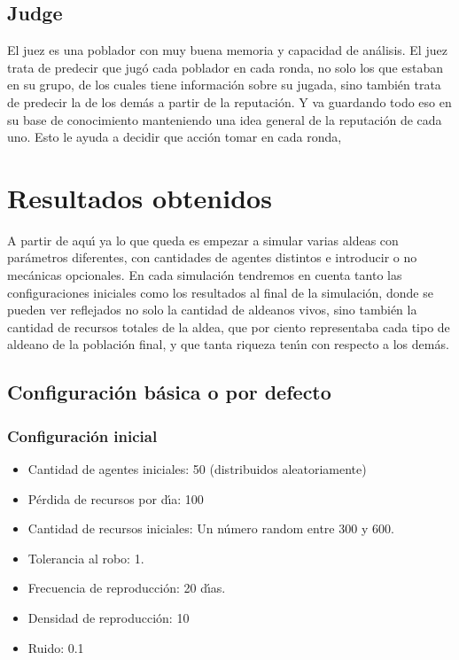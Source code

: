 \documentclass{article}
\begin{document}
\subsection{Judge}
El juez es una poblador con muy buena memoria y capacidad de an\'alisis. El juez trata de predecir que jug\'o cada poblador en cada ronda, no solo los que estaban en su grupo,
de los cuales tiene informaci\'on sobre su jugada, sino tambi\'en trata de predecir la de los dem\'as a partir de la reputaci\'on. Y va guardando todo eso en su base de conocimiento
manteniendo una idea general de la reputaci\'on de cada uno. Esto le ayuda a decidir que acci\'on tomar en cada ronda,
\newpage


\section{Resultados obtenidos}
A partir de aqu\'{\i} ya lo que queda es empezar a simular varias aldeas con par\'ametros diferentes, con cantidades de agentes distintos e introducir o no mec\'anicas opcionales.
En cada simulación tendremos en cuenta tanto las configuraciones iniciales como los resultados al final de la simulación, donde se pueden ver reflejados no solo la cantidad de aldeanos
vivos, sino tambi\'en la cantidad de recursos totales de la aldea, que por ciento representaba cada tipo de aldeano de la poblaci\'on final, y que tanta riqueza ten\'{\i}n con respecto
a los dem\'as.
\subsection{Configuraci\'on b\'asica o por defecto}

\subsubsection{Configuraci\'on inicial}
\begin{itemize}
      \item Cantidad de agentes iniciales: 50 (distribuidos aleatoriamente)
      \item P\'erdida de recursos por d\'{\i}a: 100
      \item Cantidad de recursos iniciales: Un n\'umero random entre 300 y 600.
      \item Tolerancia al robo: 1.
      \item Frecuencia de reproducci\'on: 20 d\'{\i}as.
      \item Densidad de reproducci\'on: 10
      \item Ruido: 0.1
\end{itemize}
\end{document}
